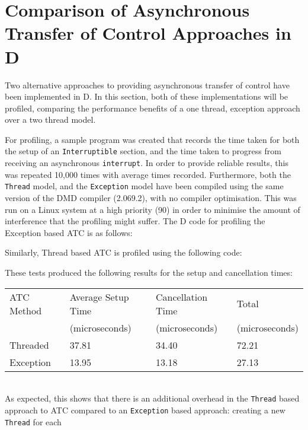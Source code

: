 \section{Comparison of Asynchronous Transfer of Control Approaches in D}
Two alternative approaches to providing asynchronous transfer of control
have been implemented in D. In this section, both of these implementations will 
be profiled, comparing the performance benefits of a one thread, exception approach over a 
two thread model. 
\par\bigskip\noindent
For profiling, a sample program was created that records the
time taken for both the setup of an \texttt{Interruptible} section, and the time 
taken to progress from receiving an asynchronous \texttt{interrupt}. In order to 
provide reliable results,
this was repeated 10,000 times with average times recorded. Furthermore, both
the \texttt{Thread} model, and the \texttt{Exception} model have been compiled 
using the same version of the DMD compiler (2.069.2), with no compiler
optimisation. This was run on a Linux system at a high
priority (90) in order to minimise the amount of interference that the
profiling might suffer. 
The D code for profiling the Exception based ATC is as follows: 

Similarly, Thread based ATC is profiled using the following code: 

These tests produced the following results for the setup and cancellation times: 
\begin{table}[!htbp]
\begin{tabular}{l|lll}
ATC Method & Average Setup Time & Cancellation Time  & Total          \\
           & (microseconds)     & (microseconds)     & (microseconds) \\ \hline
Threaded   & 37.81              & 34.40              & 72.21          \\
Exception  & 13.95              & 13.18              & 27.13          \\
\end{tabular}
\end{table} \\
As expected, this shows that there is an additional overhead in the
\texttt{Thread} based approach to ATC compared to an \texttt{Exception} based
approach: creating a new \texttt{Thread} for each
